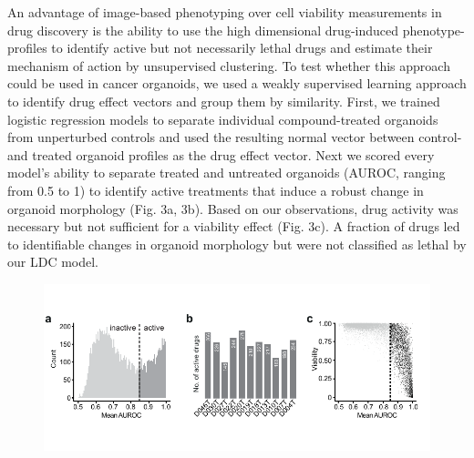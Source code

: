 \begin{flushleft}
An advantage of image-based phenotyping over cell viability measurements in drug discovery is the ability to use the high dimensional drug-induced phenotype-profiles to identify active but not necessarily lethal drugs and estimate their mechanism of action by unsupervised clustering. To test whether this approach could be used in cancer organoids, we used a weakly supervised learning approach to identify drug effect vectors and group them by similarity. First, we trained logistic regression models to separate individual compound-treated organoids from unperturbed controls and used the resulting normal vector between control- and treated organoid profiles as the drug effect vector. Next we scored every model’s ability to separate treated and untreated organoids (AUROC, ranging from 0.5 to 1) to identify active treatments that induce a robust change in organoid morphology (Fig. 3a, 3b). Based on our observations, drug activity was necessary but not sufficient for a viability effect (Fig. 3c). A fraction of drugs led to identifiable changes in organoid morphology but were not classified as lethal by our LDC model. 

\begin{figure}[h]
\centering
\includegraphics[width=\textwidth,
                height=\textheight,
                keepaspectratio]{figures/promise/pdf/fig_3_0.pdf}
\caption{}
\label{fig_230}
\end{figure}
\bigbreak


\end{flushleft}
